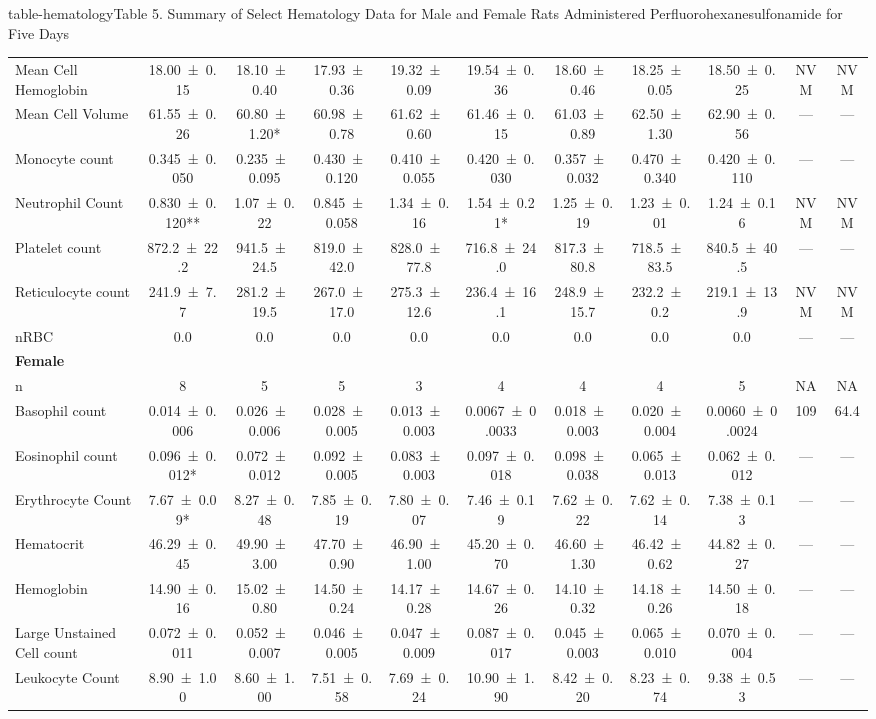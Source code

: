 \begin{landscape}
\begin{niehstable}{table-hematology}{Table 5. Summary of Select Hematology Data for Male and Female Rats Administered Perfluorohexanesulfonamide for Five Days}
\begin{tabular}{lcccccccccc}
Mean Cell Hemoglobin & 18.00 ± 0.15 & 18.10 ± 0.40 & 17.93 ± 0.36 & 19.32 ± 0.09 & 19.54 ± 0.36 & 18.60 ± 0.46 & 18.25 ± 0.05 & 18.50 ± 0.25 & NVM & NVM \\
Mean Cell Volume & 61.55 ± 0.26 & 60.80 ± 1.20* & 60.98 ± 0.78 & 61.62 ± 0.60 & 61.46 ± 0.15 & 61.03 ± 0.89 & 62.50 ± 1.30 & 62.90 ± 0.56 & — & — \\
Monocyte count & 0.345 ± 0.050 & 0.235 ± 0.095 & 0.430 ± 0.120 & 0.410 ± 0.055 & 0.420 ± 0.030 & 0.357 ± 0.032 & 0.470 ± 0.340 & 0.420 ± 0.110 & — & — \\
Neutrophil Count & 0.830 ± 0.120** & 1.07 ± 0.22 & 0.845 ± 0.058 & 1.34 ± 0.16 & 1.54 ± 0.21* & 1.25 ± 0.19 & 1.23 ± 0.01 & 1.24 ± 0.16 & NVM & NVM \\
Platelet count & 872.2 ± 22.2 & 941.5 ± 24.5 & 819.0 ± 42.0 & 828.0 ± 77.8 & 716.8 ± 24.0 & 817.3 ± 80.8 & 718.5 ± 83.5 & 840.5 ± 40.5 & — & — \\
Reticulocyte count & 241.9 ± 7.7 & 281.2 ± 19.5 & 267.0 ± 17.0 & 275.3 ± 12.6 & 236.4 ± 16.1 & 248.9 ± 15.7 & 232.2 ± 0.2 & 219.1 ± 13.9 & NVM & NVM \\
nRBC & 0.0 & 0.0 & 0.0 & 0.0 & 0.0 & 0.0 & 0.0 & 0.0 & — & — \\
\multicolumn{11}{l}{\textbf{Female}} \\
n & 8 & 5 & 5 & 3 & 4 & 4 & 4 & 5 & NA & NA \\
Basophil count & 0.014 ± 0.006 & 0.026 ± 0.006 & 0.028 ± 0.005 & 0.013 ± 0.003 & 0.0067 ± 0.0033 & 0.018 ± 0.003 & 0.020 ± 0.004 & 0.0060 ± 0.0024 & 109 & 64.4 \\
Eosinophil count & 0.096 ± 0.012* & 0.072 ± 0.012 & 0.092 ± 0.005 & 0.083 ± 0.003 & 0.097 ± 0.018 & 0.098 ± 0.038 & 0.065 ± 0.013 & 0.062 ± 0.012 & — & — \\
Erythrocyte Count & 7.67 ± 0.09* & 8.27 ± 0.48 & 7.85 ± 0.19 & 7.80 ± 0.07 & 7.46 ± 0.19 & 7.62 ± 0.22 & 7.62 ± 0.14 & 7.38 ± 0.13 & — & — \\
Hematocrit & 46.29 ± 0.45 & 49.90 ± 3.00 & 47.70 ± 0.90 & 46.90 ± 1.00 & 45.20 ± 0.70 & 46.60 ± 1.30 & 46.42 ± 0.62 & 44.82 ± 0.27 & — & — \\
Hemoglobin & 14.90 ± 0.16 & 15.02 ± 0.80 & 14.50 ± 0.24 & 14.17 ± 0.28 & 14.67 ± 0.26 & 14.10 ± 0.32 & 14.18 ± 0.26 & 14.50 ± 0.18 & — & — \\
Large Unstained Cell count & 0.072 ± 0.011 & 0.052 ± 0.007 & 0.046 ± 0.005 & 0.047 ± 0.009 & 0.087 ± 0.017 & 0.045 ± 0.003 & 0.065 ± 0.010 & 0.070 ± 0.004 & — & — \\
Leukocyte Count & 8.90 ± 1.00 & 8.60 ± 1.00 & 7.51 ± 0.58 & 7.69 ± 0.24 & 10.90 ± 1.90 & 8.42 ± 0.20 & 8.23 ± 0.74 & 9.38 ± 0.53 & — & — \\

\end{tabular}
\end{niehstable}
\end{landscape}
